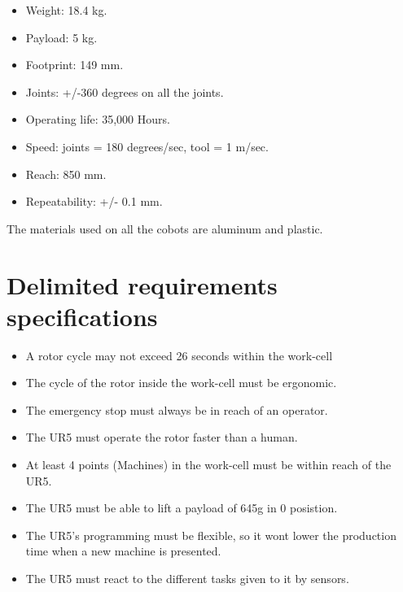 \begin{itemize}
    \item Weight: 18.4 kg.
    \item Payload: 5 kg.
    \item Footprint: 149 mm.
    \item Joints: +/-360 degrees on all the joints.
    \item Operating life: 35,000 Hours.
    \item Speed: joints = 180 degrees/sec, tool = 1 m/sec.
    \item Reach: 850 mm.
    \item Repeatability: +/- 0.1 mm.
\end{itemize}
The materials used on all the cobots are aluminum and plastic\cite{Ur5_about}\cite{UR5_tech}.






\chapter{Delimited requirements specifications}

\begin{itemize}
    \item A rotor cycle may not exceed 26 seconds within the work-cell
    \item The cycle of the rotor inside the work-cell must be ergonomic.
    \item The emergency stop must always be in reach of an operator.
    \item The UR5 must operate the rotor faster than a human.
    \item At least 4 points (Machines) in the work-cell must be within reach of the UR5.
    \item The UR5 must be able to lift a payload of 645g in 0 posistion.
    \item The UR5's programming must be flexible, so it wont lower the production time when a new machine is presented.
    \item The UR5 must react to the different tasks given to it by sensors.
\end{itemize}